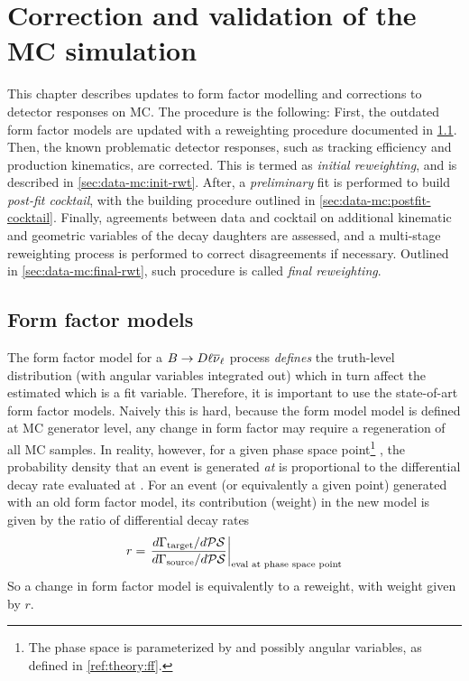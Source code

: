 \chapter{Correction and validation of the MC simulation}
\label{ref:mc-cor}

This chapter describes updates to form factor modelling and corrections to
detector responses on MC.
The procedure is the following:
First, the outdated form factor models are updated with a reweighting
procedure documented in \cref{ref:mc-cor:ff}.
Then, the known problematic detector responses,
such as tracking efficiency and \B production kinematics,
are corrected.
This is termed as \emph{initial reweighting}, and is described in
\cref{sec:data-mc:init-rwt}.
After, a \emph{preliminary} fit is performed to build
\emph{post-fit cocktail},
with the building procedure outlined in \cref{sec:data-mc:postfit-cocktail}.
Finally, agreements between data and cocktail on additional kinematic
and geometric variables of the \B decay daughters are assessed,
and a multi-stage reweighting process is
performed to correct disagreements if necessary.
Outlined in \cref{sec:data-mc:final-rwt}, such procedure is called \emph{final
reweighting}.


\section{Form factor models}
\label{ref:mc-cor:ff}

The form factor model for a $B \rightarrow D \ell{\ensuremath{{\overline{\nu}}_\ell}}$ process \emph{defines}
the truth-level \qSq distribution (with angular variables integrated out) which
in turn affect the estimated \qSq which is a fit variable.
Therefore, it is important to use the state-of-art form factor models.
Naively this is hard, because the form model model is defined at MC generator
level, any change in form factor may require a regeneration of all MC samples.
In reality, however, for a given phase space point\footnote{
    The phase space is parameterized by \qSq and possibly angular variables,
    as defined in \cref{ref:theory:ff}.
}  \PSpt, the probability density that an event is generated \emph{at}
\PSpt is proportional to the differential decay rate evaluated at
\PSpt.
For an event (or equivalently a given \PSpt point)
generated with an old form factor model,
its contribution (weight) in the new model is given by the ratio of differential
decay rates
\begin{equation}
    r = \left.
            \frac{d\Gamma_\text{target} / d\mathcal{PS}}{d\Gamma_\text{source} / d\mathcal{PS}}
        \right|_\text{eval at phase space point}
\end{equation}
So a change in form factor model is equivalently to a reweight, with weight given
by $r$.

